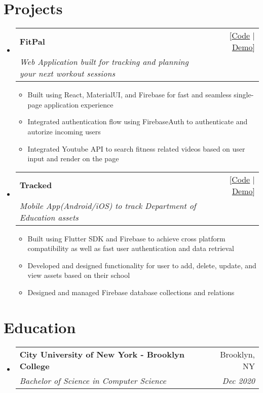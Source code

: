 \documentclass[letterpaper,11pt]{article}
\makeatletter
\newcommand{\resumeItem}[2]{
  \item\small{
    \textbf{#1}#2\vspace{-2pt}
  }
}
\newcommand{\resumeSubheading}[4]{
  \vspace{-1pt}\item
    \begin{tabular*}{0.97\textwidth}[t]{l@{\extracolsep{\fill}}r}
      \textbf{#1} & #2 \\
      \textit{\small#3} & \textit{\small #4} \\
    \end{tabular*}\vspace{-5pt}
}
\newcommand{\resumeSubHeadingListStart}{\begin{itemize}[leftmargin=*]}
\newcommand{\resumeSubHeadingListEnd}{\end{itemize}}
\newcommand{\resumeItemListStart}{\begin{itemize}}
\newcommand{\resumeItemListEnd}{\end{itemize}\vspace{-5pt}}
\makeatother
\begin{document}
\section{Projects}
  \resumeSubHeadingListStart
  \resumeSubheading
  {FitPal}{[{\href{https://github.com/fit-pal/my-workout-tracker}{Code}} | {\href{https://my-workout-tracker-8763c.web.app/}{Demo}}]}
  {Web Application built for tracking and planning your next workout sessions}{}
  \resumeItemListStart
    \resumeItem{}
        {Built using React, MaterialUI, and Firebase for fast and seamless single-page application experience}
    \resumeItem{}
        {Integrated authentication flow using FirebaseAuth to authenticate and autorize incoming users}
    \resumeItem{}
        {Integrated Youtube API to search fitness related videos based on user input and render on the page}
  \resumeItemListEnd
  \resumeSubheading
  {Tracked}{[{\href{https://github.com/ajilk/tracked} {Code}} | {\href{https://ajilk.com/tracked/}{Demo}}]}
  {Mobile App(Android/iOS) to track Department of Education assets}{}
  \resumeItemListStart
    \resumeItem{}
        {Built using Flutter SDK and Firebase to achieve cross platform compatibility as well as fast user authentication
        and data retrieval}
    \resumeItem{}
        {Developed and designed functionality for user to add, delete, update, and view assets based on their school}
        \resumeItem{}
        {Designed and managed Firebase database collections and relations}
        
  \resumeItemListEnd
    
  \resumeSubHeadingListEnd

\section{Education}
  \resumeSubHeadingListStart
    \resumeSubheading
      {City University of New York - Brooklyn College}{Brooklyn, NY}
      {Bachelor of Science in Computer Science}{Dec 2020}
  \resumeSubHeadingListEnd
\end{document}
